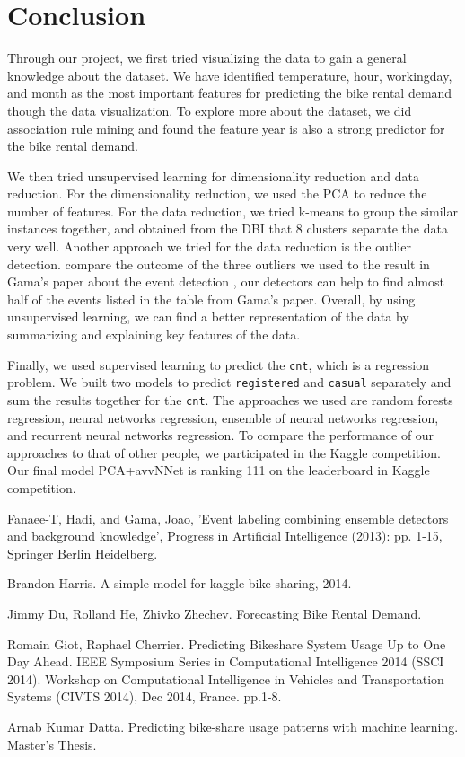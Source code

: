 \documentclass[12pt]{article}
\begin{document}
\section{Conclusion}
	\label{sec:conclusion}
Through our project, we first tried visualizing the data to gain a general knowledge about the dataset. We have identified temperature, hour, workingday, and month as the most important features for predicting the bike rental demand though the data visualization. To explore more about the dataset, we did association rule mining and found the feature year is also a strong predictor for the bike rental demand.  

We then tried unsupervised learning for dimensionality reduction and data reduction. For the dimensionality reduction, we used the PCA to reduce the number of features. For the data reduction, we tried k-means to group the similar instances together, and obtained from the DBI that 8 clusters separate the data very well. Another approach we tried for the data reduction is the outlier detection. compare the outcome of the three outliers we used to the result in Gama's paper about the event detection \cite{dataset}, our detectors can help to find almost half of the events listed in the table from Gama's paper. Overall, by using unsupervised learning, we can find a better representation of the data by summarizing and explaining key features of the data.
	

Finally, we used supervised learning to predict the \texttt{cnt}, which is a regression problem. We built two models to predict \texttt{registered} and \texttt{casual} separately and sum the results together for the \texttt{cnt}. The approaches we used are random forests regression, neural networks regression, ensemble of neural networks regression, and recurrent neural networks regression. To compare the performance of our approaches to that of other people, we participated in the Kaggle competition. Our final model PCA+avvNNet is ranking 111 on the leaderboard in Kaggle competition.  
	
\begin{thebibliography}{9}
		Fanaee-T, Hadi, and Gama, Joao, 'Event labeling combining ensemble detectors and background knowledge', Progress in Artificial Intelligence (2013): pp. 1-15, Springer Berlin Heidelberg.
	
	
	Brandon Harris. A simple model for kaggle bike sharing, 2014.
	
	Jimmy Du, Rolland He, Zhivko Zhechev. Forecasting Bike Rental Demand.
	
	Romain Giot, Raphael Cherrier. Predicting Bikeshare System Usage Up to One Day Ahead.
	IEEE Symposium Series in Computational Intelligence 2014 (SSCI 2014). Workshop on Computational Intelligence in Vehicles and Transportation Systems (CIVTS 2014), Dec 2014, France.
	pp.1-8. 
	
	Arnab Kumar Datta. Predicting bike-share usage patterns with
	machine learning. Master's Thesis.
\end{thebibliography}
\end{document}
